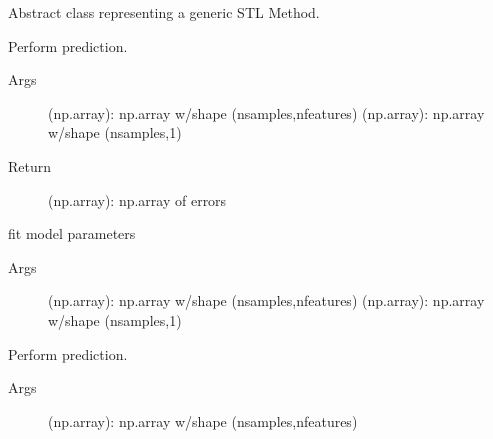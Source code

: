 \documentclass[letterpaper,10pt,english,openany,oneside]{sphinxmanual}
\begin{document}
\begin{fulllineitems}
\label{\detokenize{base:methods.base.BaseEstimator}}
Abstract class representing a generic STL Method.

\begin{fulllineitems}
\label{\detokenize{base:methods.base.BaseEstimator.evaluate}}
Perform prediction.
\begin{description}
\item[{Args}] \leavevmode
{} (np.array):
np.array w/shape (nsamples,nfeatures)
 (np.array):
np.array w/shape (nsamples,1)

\item[{Return}] \leavevmode
{} (np.array):
np.array of errors

\end{description}

\end{fulllineitems}


\begin{fulllineitems}
\label{\detokenize{base:methods.base.BaseEstimator.fit}}
fit model parameters
\begin{description}
\item[{Args}] \leavevmode
{} (np.array):
np.array w/shape (nsamples,nfeatures)
 (np.array):
np.array w/shape (nsamples,1)

\end{description}

\end{fulllineitems}


\begin{fulllineitems}
\label{\detokenize{base:methods.base.BaseEstimator.predict}}
Perform prediction.
\begin{description}
\item[{Args}] \leavevmode
{} (np.array):
np.array w/shape (nsamples,nfeatures)


\end{description}
\end{fulllineitems}
\end{fulllineitems}
\end{document}
